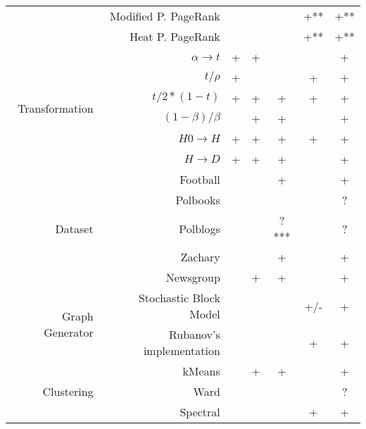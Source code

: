 \documentclass{article}
\begin{document}
\begin{table}[H]
\begin{tabular}{rr|cccc|c}
                & Modified P. PageRank     &            &          &        & +**         & \cellcolor{yellow!25} +** \\
                & Heat P. PageRank         &            &          &        & +**         & \cellcolor{yellow!25} +** \\
                \hline
\multirow{6}{*}{Transformation} & $\alpha \rightarrow t$ & + & +   &        &             & +      \\
                & $t / \rho$               & +          &          &        & +           & +      \\
                & $t / 2*(1 - t)$          & +          & +        & +      & +           & +      \\
                & $(1 - \beta) / \beta$    &            & +        & +      &             & +      \\
                & $H0 \rightarrow H$       & +          & +        & +      & +           & +      \\
                & $H \rightarrow D$        & +          & +        & +      &             & +      \\
                \hline
\multirow{5}{*}{Dataset} & Football        &            &          & +      &             & +      \\
                & Polbooks                 &            &          &        &             & \cellcolor{yellow!25} ? \\
                & Polblogs                 &            &          & ?***   &             & \cellcolor{yellow!25} ? \\
                & Zachary                  &            &          & +      &             & +      \\
                & Newsgroup                &            & +        & +      &             & +      \\
                \hline
\multirow{2}{*}{Graph Generator} & Stochastic Block Model &  &     &        & \cellcolor{yellow!25} +/- & \cellcolor{yellow!25} + \\
                & Rubanov's implementation &            &          &        & +           & +      \\
                \hline
\multirow{3}{*}{Clustering} & kMeans       &            & +        & +      &             & +      \\
                & Ward                     &            &          &        &             & \cellcolor{yellow!25} ? \\
                & Spectral                 &            &          &        & +           & +
\end{tabular}
\end{table}
\end{document}

